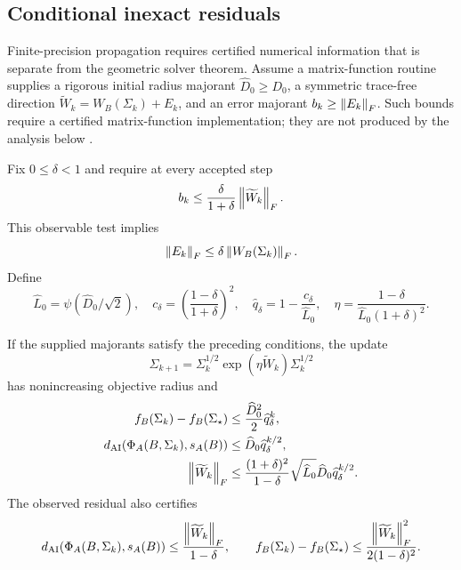 \subsection{Conditional inexact residuals}

Finite-precision propagation requires certified numerical information that is
separate from the geometric solver theorem.  Assume a matrix-function routine
supplies a rigorous initial radius majorant \(\widehat D_0\ge D_0\), a
symmetric trace-free direction
\(\widetilde W_k=W_B(\Sigma_k)+E_k\), and an error majorant
\(b_k\ge\left\lVert E_k\right\rVert_F\).  Such bounds require a certified matrix-function
implementation; they are not produced by the analysis below
\cite{higham2008functions}.

Fix \(0\le\delta<1\) and require at every accepted step
\begin{equation}
  b_k\le\frac{\delta}{1+\delta}\left\lVert \widetilde W_k\right\rVert_F.
  \label{eq:computable-relative-error-test}
\end{equation}
This observable test implies
\begin{equation}
  \left\lVert E_k\right\rVert_F\le\delta\left\lVert W_B(\Sigma_k)\right\rVert_F.
  \label{eq:relative-residual-error}
\end{equation}
Define
\begin{equation}
  \widehat L_0=\psi(\widehat D_0/\sqrt2),
  \quad
  c_\delta=\left(\frac{1-\delta}{1+\delta}\right)^2,
  \quad
  \widehat q_\delta=1-\frac{c_\delta}{\widehat L_0},
  \quad
  \eta=\frac{1-\delta}{\widehat L_0(1+\delta)^2}.
  \label{eq:inexact-step}
\end{equation}

\begin{corollary}
\label{cor:inexact-action-solver}
If the supplied majorants satisfy the preceding conditions, the update
\[
  \Sigma_{k+1}
  =\Sigma_k^{1/2}\exp(\eta\widetilde W_k)\Sigma_k^{1/2}
\]
has nonincreasing objective radius and
\begin{align}
  f_B(\Sigma_k)-f_B(\Sigma_\star)
  &\le\frac{\widehat D_0^2}{2}\widehat q_\delta^k,
  \label{eq:inexact-value-rate}\\
  d_{\mathrm{AI}}(\Phi_A(B,\Sigma_k),s_A(B))
  &\le\widehat D_0\widehat q_\delta^{k/2},
  \label{eq:inexact-distance-rate}\\
  \left\lVert \widetilde W_k\right\rVert_F
  &\le\frac{(1+\delta)^2}{1-\delta}
  \sqrt{\widehat L_0}\widehat D_0\widehat q_\delta^{k/2}.
  \label{eq:inexact-residual-rate}
\end{align}
The observed residual also certifies
\begin{equation}
  d_{\mathrm{AI}}(\Phi_A(B,\Sigma_k),s_A(B))
  \le\frac{\left\lVert \widetilde W_k\right\rVert_F}{1-\delta},
  \qquad
  f_B(\Sigma_k)-f_B(\Sigma_\star)
  \le\frac{\left\lVert \widetilde W_k\right\rVert_F^2}{2(1-\delta)^2}.
  \label{eq:inexact-certificates}
\end{equation}
\end{corollary}

